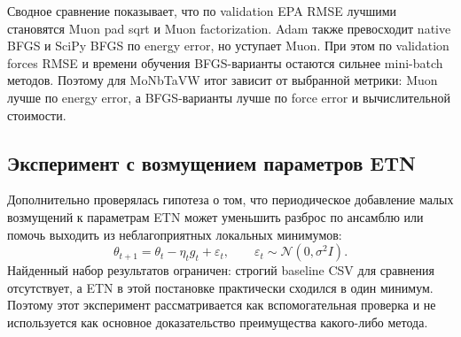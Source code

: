 Сводное сравнение показывает, что по validation EPA RMSE лучшими становятся Muon pad sqrt и Muon factorization. Adam также превосходит native BFGS и SciPy BFGS по energy error, но уступает Muon. При этом по validation forces RMSE и времени обучения BFGS-варианты остаются сильнее mini-batch методов. Поэтому для MoNbTaVW итог зависит от выбранной метрики: Muon лучше по energy error, а BFGS-варианты лучше по force error и вычислительной стоимости.

\FloatBarrier

\subsection{Эксперимент с возмущением параметров ETN}

Дополнительно проверялась гипотеза о том, что периодическое добавление малых возмущений к параметрам ETN может уменьшить разброс по ансамблю или помочь выходить из неблагоприятных локальных минимумов:
\[
\theta_{t+1}
=
\theta_t
-
\eta_t g_t
+
\varepsilon_t,
\qquad
\varepsilon_t
\sim
\mathcal N(0,\sigma^2 I).
\]
Найденный набор результатов ограничен: строгий baseline CSV для сравнения отсутствует, а ETN в этой постановке практически сходился в один минимум. Поэтому этот эксперимент рассматривается как вспомогательная проверка и не используется как основное доказательство преимущества какого-либо метода.

\FloatBarrier
